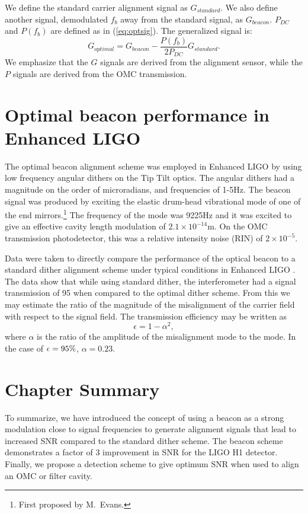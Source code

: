 We define the standard carrier alignment signal as $G_{standard}$. %
We also define another signal, demodulated $f_b$ away from the standard signal, as $G_{beacon}$. %
$P_{DC}$ and $P(f_b)$ are defined as in (\ref{eq:optsig}). %
The generalized signal is:
%
\begin{equation}
G_{optimal} = G_{beacon} - \frac{P(f_b)}{2P_{DC}} G_{standard}.
\end{equation}
%
We emphasize that the $G$ signals are derived from the alignment sensor, while the $P$ signals are derived from the OMC transmission.

\section{Optimal beacon performance in Enhanced LIGO}
The optimal beacon alignment scheme was employed in Enhanced LIGO by using low frequency angular dithers on the Tip Tilt optics. %
The angular dithers had a magnitude on the order of microradians, and frequencies of 1-5Hz. %
The beacon signal was produced by exciting the elastic drum-head vibrational mode of one of the end mirrors.\footnote{First proposed by M.\ Evans.} The frequency of the mode was 9225Hz and it was excited to give an effective cavity length modulation of $2.1\times10^{-14}$m. %
On the OMC transmission photodetector, this was a relative intensity noise (RIN) of $2\times10^{-5}$.

Data were taken to directly compare the performance of the optical beacon to a standard dither alignment scheme under typical conditions in Enhanced LIGO \cite{mattbeaconmeas}. %
The data show that while using standard dither, the interferometer had a signal transmission of 95\perc{} when compared to the optimal dither scheme. %
From this we may estimate the ratio of the magnitude of the misalignment of the carrier field with respect to the signal field. %
The transmission efficiency may be written as
\begin{equation}
\epsilon = 1 - \alpha^2,
\end{equation}
where $\alpha$ is the ratio of the amplitude of the misalignment mode to the  mode. %
In the case of $\epsilon = 95\%{}$, $\alpha = 0.23$.
\section{Chapter Summary}
To summarize, we have introduced the concept of using a beacon as a strong modulation close to signal frequencies to generate alignment signals that lead to increased SNR compared to the standard dither scheme. %
The beacon scheme demonstrates a factor of 3 improvement in SNR for the LIGO H1 detector. %
Finally, we propose a detection scheme to give optimum SNR when used to align an OMC or filter cavity.
